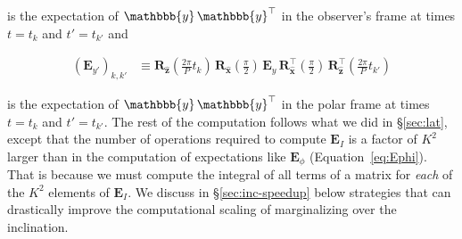 \documentclass[modern,linenumbers]{aastex62}
\begin{document}
%
is the expectation of $\mathbbb{y}\,\mathbbb{y}^\top$ in the
observer's frame at times $t = t_k$ and $t' = t_{k'}$
and
%
\begin{linenomath}\begin{align}
        \left(\mathbf{E}_{y'}\right)_{k,k'}
         & \equiv
        \mathbf{R}_{\hat{\mathbf{z}}}\left(\frac{2\pi}{P}t_k\right) \,
        \mathbf{R}_{\hat{\mathbf{x}}}\left(\frac{\pi}{2}\right) \,
        \mathbf{E}_y \,
        \mathbf{R}_{\hat{\mathbf{x}}}^\top\left(\frac{\pi}{2}\right) \,
        \mathbf{R}_{\hat{\mathbf{z}}}^\top\left(\frac{2\pi}{P}t_{k'}\right)
    \end{align}\end{linenomath}
%
is the expectation of $\mathbbb{y}\,\mathbbb{y}^\top$ in the
polar frame at times $t = t_k$ and $t' = t_{k'}$.
%
The rest of the computation follows what we did in \S\ref{sec:lat},
except that the number of operations required to compute $\mathbf{E}_I$
is a factor of $K^2$ larger than in the computation of expectations
like $\mathbf{E}_\phi$ (Equation~\ref{eq:Ephi}). That is because we
must compute the integral of all terms of a matrix
for \emph{each} of the $K^2$ elements of $\mathbf{E}_I$.
We discuss in \S\ref{sec:inc-speedup} below strategies that can drastically
improve the computational scaling of marginalizing over the inclination.
\end{document}
